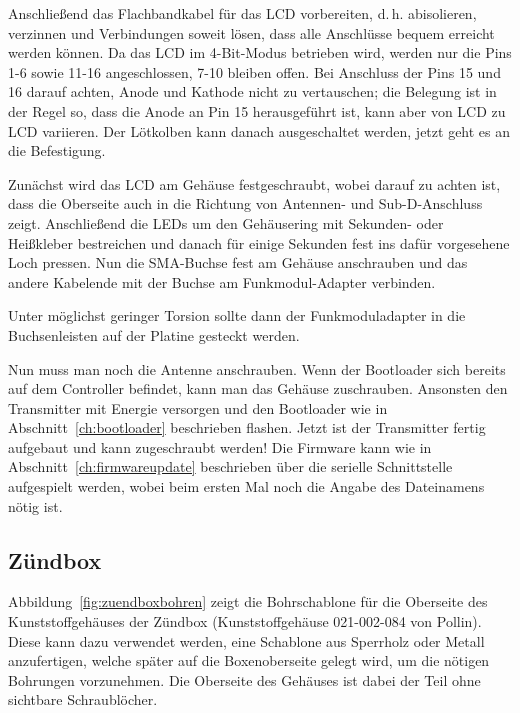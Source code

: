 \documentclass[paper=a4, parskip, numbers=noenddot, toc=listof, headsepline]{scrbook}
\begin{document}
					Anschließend das Flachbandkabel für das LCD vorbereiten, d.\,h. abisolieren, verzinnen und Verbindungen soweit lösen, dass alle Anschlüsse bequem erreicht werden können. Da das LCD im 4-Bit-Modus betrieben wird, werden nur die Pins 1-6 sowie 11-16 angeschlossen, 7-10 bleiben offen. Bei Anschluss der Pins 15 und 16 darauf achten, Anode und Kathode nicht zu vertauschen; die Belegung ist in der Regel so, dass die Anode an Pin 15 herausgeführt ist, kann aber von LCD zu LCD variieren. Der Lötkolben kann danach ausgeschaltet werden, jetzt geht es an die Befestigung.

					Zunächst wird das LCD am Gehäuse festgeschraubt, wobei darauf zu achten ist, dass die Oberseite auch in die Richtung von Antennen- und Sub-D-Anschluss zeigt. Anschließend die LEDs um den Gehäusering mit Sekunden- oder Heißkleber bestreichen und danach für einige Sekunden fest ins dafür vorgesehene Loch pressen. Nun die SMA-Buchse fest am Gehäuse anschrauben und das andere Kabelende mit der Buchse am Funkmodul-Adapter verbinden.

					Unter möglichst geringer Torsion sollte dann der Funkmoduladapter in die Buchsenleisten auf der Platine gesteckt werden.

					Nun muss man noch die Antenne anschrauben. Wenn der Bootloader sich bereits auf dem Controller befindet, kann man das Gehäuse zuschrauben. Ansonsten den Transmitter mit Energie versorgen und den Bootloader wie in Abschnitt~\ref{ch:bootloader} beschrieben flashen. Jetzt ist der Transmitter fertig aufgebaut und kann zugeschraubt werden! Die Firmware kann wie in Abschnitt~\ref{ch:firmwareupdate} beschrieben über die serielle Schnittstelle aufgespielt werden, wobei beim ersten Mal noch die Angabe des Dateinamens nötig ist.

				\subsection{Zündbox}
					Abbildung~\ref{fig:zuendboxbohren} zeigt die Bohrschablone für die Oberseite des Kunststoffgehäuses der Zündbox (Kunststoffgehäuse 021-002-084 von Pollin). Diese kann dazu verwendet werden, eine Schablone aus Sperrholz oder Metall anzufertigen, welche später auf die Boxenoberseite gelegt wird, um die nötigen Bohrungen vorzunehmen. Die Oberseite des Gehäuses ist dabei der Teil ohne sichtbare Schraublöcher.
\end{document}
